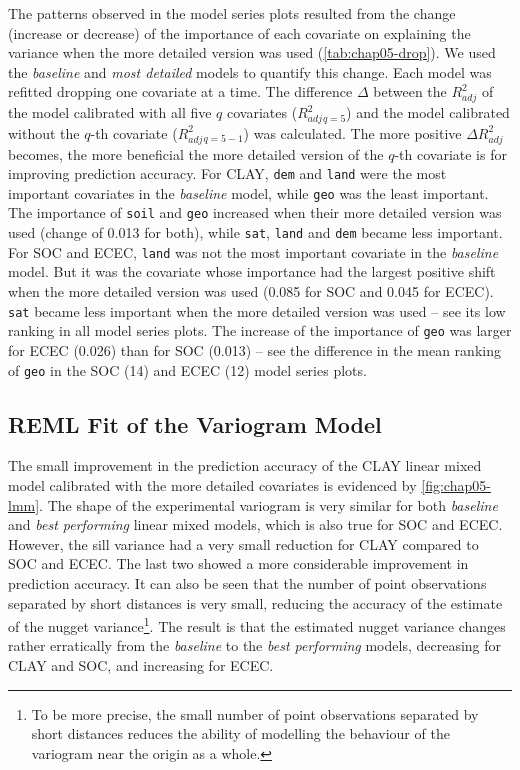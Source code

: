 The patterns observed in the model series plots resulted from the change (increase or decrease) of the 
importance of each covariate on explaining the variance when the more detailed version was used 
(\autoref{tab:chap05-drop}). We used the \emph{baseline} and \emph{most detailed} models to quantify this 
change. Each model was refitted dropping one covariate at a time. The difference $\Delta$ between the 
${R}^{2}_{adj}$ of the model calibrated with all five $q$ covariates (${R}^{2}_{adj}{}_{q = 5}$) and the model 
calibrated without the $q$-th covariate ($R^{2}_{adj}{}_{q = 5 - 1}$) was calculated. The more positive 
$\Delta{R}^{2}_{adj}$ becomes, the more beneficial the more detailed version of the $q$-th covariate is for 
improving prediction accuracy. For CLAY, \texttt{dem} and \texttt{land} were the most important covariates in 
the \emph{baseline} model, while \texttt{geo} was the least important. The importance of \texttt{soil} and 
\texttt{geo} increased when their more detailed version was used (change of \SI{+0.013}{\pp} for both), while 
\texttt{sat}, \texttt{land} and \texttt{dem} became less important. For SOC and ECEC, \texttt{land} was not 
the most important covariate in the \emph{baseline} model. But it was the covariate whose importance had the 
largest positive shift when the more detailed version was used (\SI{+0.085}{\pp} for SOC and \SI{+0.045}{\pp}
for ECEC). \texttt{sat} became less important when the more detailed version was used -- see its low ranking 
in all model series plots. The increase of the importance of \texttt{geo} was larger for ECEC 
(\SI{+0.026}{\pp}) than for SOC (\SI{+0.013}{\pp}) -- see the difference in the mean ranking of \texttt{geo} in 
the SOC (\num{14}) and ECEC (\num{12}) model series plots.



\subsection{REML Fit of the Variogram Model}

\def\footnugget{\footnote{To be more precise, the small number of point observations separated by short 
distances reduces the ability of modelling the behaviour of the variogram near the origin as a whole.}}

The small improvement in the prediction accuracy of the CLAY linear mixed model calibrated with the more 
detailed covariates is evidenced by \autoref{fig:chap05-lmm}. The shape of the experimental variogram is very 
similar for both \emph{baseline} and \emph{best performing} linear mixed models, which is also true for SOC 
and ECEC. However, the sill variance had a very small reduction for CLAY compared to SOC and ECEC. The last 
two showed a more considerable improvement in prediction accuracy. It can also be seen that the number of 
point observations separated by short distances is very small, reducing the accuracy of the estimate of the 
nugget variance\footnugget{}. The result is that the estimated nugget variance changes rather erratically 
from the \emph{baseline} to the \emph{best performing} models, decreasing for CLAY and SOC, and increasing 
for ECEC.


